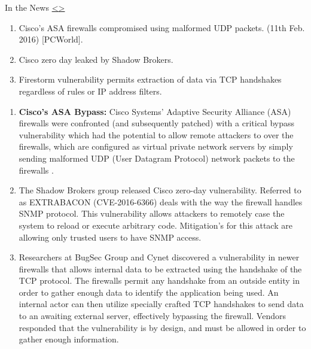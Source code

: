 \documentclass[12pt]{extarticle}
\newenvironment{instructionblock}{\Large\bgroup}{\egroup}
\newcommand{\ben}{\begin{enumerate}}
\newcommand{\een}{\end{enumerate}}
\begin{document}




\pagebreak
\begin{slide}{ In the News }{ \hyperref[slide 6]{\textless}\hyperref[slide 8]{\textgreater} }
\begin{instructionblock}
	\begin{enumerate}
		\item Cisco's ASA firewalls compromised using malformed UDP packets. (11th Feb. 2016) \cite{Cisco2016Constantin} [PCWorld].
		\item Cisco zero day leaked by Shadow Brokers.
		\item Firestorm vulnerability permits extraction of data via TCP handshakes regardless of rules or IP address filters.
	\end{enumerate}
\end{instructionblock}
\end{slide}

\vspace{8mm}
\ben

\item { \textbf{Cisco's ASA Bypass:} Cisco Systems' Adaptive Security Alliance (ASA) firewalls were confronted (and subsequently patched) with a critical bypass vulnerability which had the potential to allow remote attackers to over the firewalls, which are configured as virtual private network servers by simply sending malformed UDP (User Datagram Protocol) network packets to the firewalls \cite{Cisco2016Constantin}.}

\item The Shadow Brokers group released Cisco zero-day  vulnerability. Referred to as EXTRABACON (CVE-2016-6366) deals with the way the firewall handles SNMP protocol. This vulnerability allows attackers to remotely case the system to reload or execute arbitrary code.\cite{Kovacs2016EXTRABACON} Mitigation's for this attack are allowing only trusted users to have SNMP access.

\item Researchers at BugSec Group and Cynet discovered a vulnerability in newer firewalls that allows internal data to be extracted using the handshake of the TCP protocol. The firewalls permit any handshake from an outside entity in order to gather enough data to identify the application being used. An internal actor can then utilize specially crafted TCP handshakes to send data to an awaiting external server, effectively bypassing the firewall. Vendors responded that the vulnerability is by design, and must be allowed in order to gather enough information. \cite{FireStorm-Cynet}
\een
\end{document}
